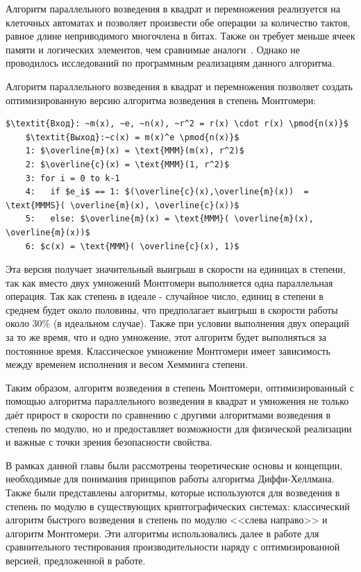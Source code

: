 \documentclass[times,specification,annotation]{itmo-student-thesis}
\begin{document}
Алгоритм параллельного возведения в квадрат и перемножения реализуется на клеточных автоматах и позволяет
произвести обе операции за количество тактов, равное длине неприводимого многочлена в битах.
Также он требует меньше ячеек памяти и логических элементов, чем сравнимые аналоги~\cite{ku04}.
Однако не проводилось исследований по программным реализациям данного алгоритма.

Алгоритм параллельного возведения в квадрат и перемножения позволяет создать оптимизированную версию алгоритма возведения в степень Монтгомери:
\begin{lstlisting}[breaklines=true, mathescape=true]
    $\textit{Вход}: ~m(x), ~e, ~n(x), ~r^2 = r(x) \cdot r(x) \pmod{n(x)}$
    $\textit{Выход}:~c(x) = m(x)^e \pmod{n(x)}$
    1: $\overline{m}(x) = \text{MMM}(m(x), r^2)$
    2: $\overline{c}(x) = \text{MMM}(1, r^2)$
    3: for i = 0 to k-1
    4:   if $e_i$ == 1: $(\overline{c}(x),\overline{m}(x))  = \text{MMMS}( \overline{m}(x), \overline{c}(x))$
    5:   else: $\overline{m}(x) = \text{MMM}( \overline{m}(x), \overline{m}(x))$
    6: $c(x) = \text{MMM}( \overline{c}(x), 1)$
\end{lstlisting}
Эта версия получает значительный выигрыш в скорости на единицах в степени, так как вместо двух
умножений Монтгомери выполняется одна параллельная операция.
Так как степень в идеале - случайное число, единиц в степени в среднем будет около половины,
что предполагает выигрыш в скорости работы около 30\% (в идеальном случае).
Также при условии выполнения двух операций за то же время, что и одно умножение, этот алгоритм будет выполняться за постоянное время.
Классическое умножение Монтгомери имеет зависимость между временем исполнения и весом Хемминга степени.

Таким образом, алгоритм возведения в степень Монтгомери, оптимизированный с помощью алгоритма параллельного возведения
в квадрат и умножения не только даёт прирост в скорости по сравнению с другими алгоритмами
возведения в степень по модулю, но и предоставляет возможности для физической реализации и важные с точки зрения безопасности свойства.

\finishrelatedwork
\chapterconclusion

В рамках данной главы были рассмотрены теоретические основы и концепции, необходимые для понимания принципов работы алгоритма Диффи-Хеллмана.
Также были представлены алгоритмы, которые используются для возведения в степень по модулю в существующих криптографических системах:
классический алгоритм быстрого возведения в степень по модулю <<слева направо>> и алгоритм Монтгомери.
Эти алгоритмы использовались далее в работе для сравнительного тестирования производительности наряду с оптимизированной версией, предложенной в работе.
\end{document}
